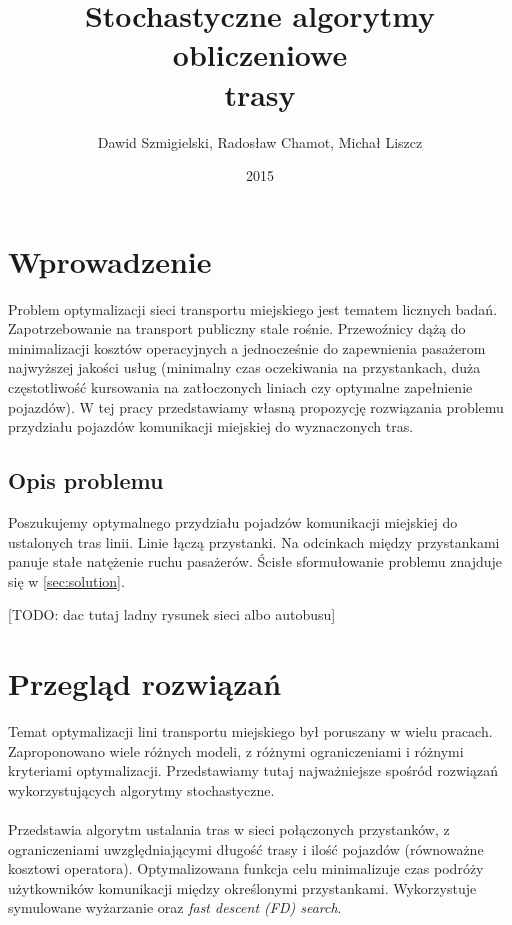 \documentclass[a4paper]{article}
\author{Dawid Szmigielski, Radosław Chamot, Michał Liszcz}
\title{Stochastyczne algorytmy obliczeniowe \\ trasy}
\date{2015}
\begin{document}
\maketitle
\newpage

\tableofcontents
\newpage



\section{Wprowadzenie} \label{sec:intro}
Problem optymalizacji sieci transportu miejskiego jest tematem licznych badań. Zapotrzebowanie na transport publiczny stale rośnie. Przewoźnicy dążą do minimalizacji kosztów operacyjnych a jednocześnie do zapewnienia pasażerom najwyższej jakości usług (minimalny czas oczekiwania na przystankach, duża częstotliwość kursowania na zatłoczonych liniach czy optymalne zapełnienie pojazdów). W tej pracy przedstawiamy własną propozycję rozwiązania problemu przydziału pojazdów komunikacji miejskiej do wyznaczonych tras.

\subsection{Opis problemu}
Poszukujemy optymalnego przydziału pojadzów komunikacji miejskiej do ustalonych tras linii. Linie łączą przystanki. Na odcinkach między przystankami panuje stałe natężenie ruchu pasażerów. Ścisłe sformułowanie problemu znajduje się w \autoref{sec:solution}.

[TODO: dac tutaj ladny rysunek sieci albo autobusu]

\newpage




\section{Przegląd rozwiązań}
Temat optymalizacji lini transportu miejskiego był poruszany w wielu pracach. Zaproponowano wiele różnych modeli, z różnymi ograniczeniami i różnymi kryteriami optymalizacji. Przedstawiamy tutaj najważniejsze spośród rozwiązań wykorzystujących algorytmy stochastyczne.

\paragraph{\cite{bib-large-scale}}
Przedstawia algorytm ustalania tras w sieci połączonych przystanków, z ograniczeniami uwzględniającymi długość trasy i ilość pojazdów (równoważne kosztowi operatora). Optymalizowana funkcja celu minimalizuje czas podróży użytkowników komunikacji między określonymi przystankami. Wykorzystuje symulowane wyżarzanie oraz \textit{fast descent (FD) search}.
\end{document}
